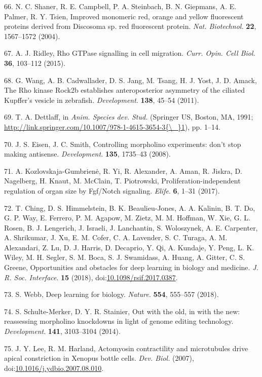\documentclass[11pt,singlespacinge,twoside]{reedthesis} %
\begin{document}
\leavevmode\hypertarget{ref-Shaner2004}{}%
66. N. C. Shaner, R. E. Campbell, P. A. Steinbach, B. N. Giepmans, A. E. Palmer, R. Y. Tsien, Improved monomeric red, orange and yellow fluorescent proteins derived from Discosoma sp. red fluorescent protein. \emph{Nat. Biotechnol.} \textbf{22}, 1567--1572 (2004).

\leavevmode\hypertarget{ref-Ridley2015}{}%
67. A. J. Ridley, Rho GTPase signalling in cell migration. \emph{Curr. Opin. Cell Biol.} \textbf{36}, 103--112 (2015).

\leavevmode\hypertarget{ref-Wang2011}{}%
68. G. Wang, A. B. Cadwallader, D. S. Jang, M. Tsang, H. J. Yost, J. D. Amack, The Rho kinase Rock2b establishes anteroposterior asymmetry of the ciliated Kupffer's vesicle in zebrafish. \emph{Development}. \textbf{138}, 45--54 (2011).

\leavevmode\hypertarget{ref-Dettlaff1991}{}%
69. T. A. Dettlaff, in \emph{Anim. Species dev. Stud.} (Springer US, Boston, MA, 1991; \href{http://link.springer.com/10.1007/978-1-4615-3654-3\%7B/_\%7D1}{http://link.springer.com/10.1007/978-1-4615-3654-3\{\textbackslash{}\_\}1}), pp. 1--14.

\leavevmode\hypertarget{ref-Eisen2008b}{}%
70. J. S. Eisen, J. C. Smith, Controlling morpholino experiments: don't stop making antisense. \emph{Development}. \textbf{135}, 1735--43 (2008).

\leavevmode\hypertarget{ref-Kozlovskaja-Gumbriene2017}{}%
71. A. Kozlovskaja-Gumbrienė, R. Yi, R. Alexander, A. Aman, R. Jiskra, D. Nagelberg, H. Knaut, M. McClain, T. Piotrowski, Proliferation-independent regulation of organ size by Fgf/Notch signaling. \emph{Elife}. \textbf{6}, 1--31 (2017).

\leavevmode\hypertarget{ref-Ching2018}{}%
72. T. Ching, D. S. Himmelstein, B. K. Beaulieu-Jones, A. A. Kalinin, B. T. Do, G. P. Way, E. Ferrero, P. M. Agapow, M. Zietz, M. M. Hoffman, W. Xie, G. L. Rosen, B. J. Lengerich, J. Israeli, J. Lanchantin, S. Woloszynek, A. E. Carpenter, A. Shrikumar, J. Xu, E. M. Cofer, C. A. Lavender, S. C. Turaga, A. M. Alexandari, Z. Lu, D. J. Harris, D. Decaprio, Y. Qi, A. Kundaje, Y. Peng, L. K. Wiley, M. H. Segler, S. M. Boca, S. J. Swamidass, A. Huang, A. Gitter, C. S. Greene, Opportunities and obstacles for deep learning in biology and medicine. \emph{J. R. Soc. Interface}. \textbf{15} (2018), doi:\href{https://doi.org/10.1098/rsif.2017.0387}{10.1098/rsif.2017.0387}.

\leavevmode\hypertarget{ref-Webb2018}{}%
73. S. Webb, Deep learning for biology. \emph{Nature}. \textbf{554}, 555--557 (2018).

\leavevmode\hypertarget{ref-Schulte-Merker2014c}{}%
74. S. Schulte-Merker, D. Y. R. Stainier, Out with the old, in with the new: reassessing morpholino knockdowns in light of genome editing technology. \emph{Development}. \textbf{141}, 3103--3104 (2014).

\leavevmode\hypertarget{ref-Lee2007a}{}%
75. J. Y. Lee, R. M. Harland, Actomyosin contractility and microtubules drive apical constriction in Xenopus bottle cells. \emph{Dev. Biol.} (2007), doi:\href{https://doi.org/10.1016/j.ydbio.2007.08.010}{10.1016/j.ydbio.2007.08.010}.
\end{document}
